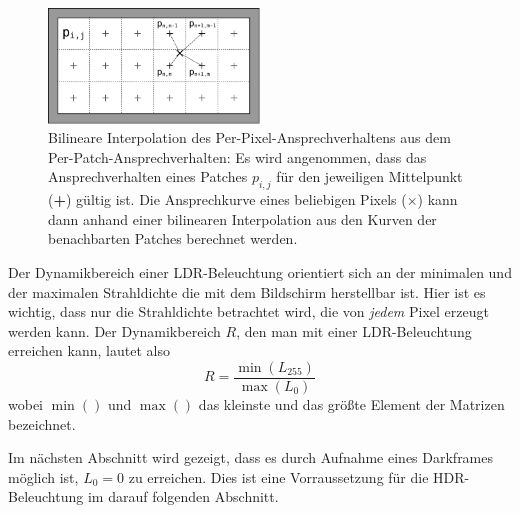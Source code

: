   \begin{figure}[h]
    \centering
    \includegraphics[width=0.5\textwidth]{../graphics/beleuchtung/interpolation.svg}
    \caption[Interpolation des Per-Pixel-Ansprechverhaltens]{ Bilineare Interpolation des Per-Pixel-Ansprechverhaltens aus dem Per-Patch-Ansprechverhalten:
          Es wird angenommen, dass das Ansprechverhalten eines Patches $p_{i,j}$ für den jeweiligen Mittelpunkt (\textbf{+}) gültig ist.
          Die Ansprechkurve eines beliebigen Pixels ($\times$) kann dann anhand einer bilinearen Interpolation aus den Kurven der benachbarten Patches berechnet werden.
          }
    \label{fig:interpolation}
   \end{figure}



%    
 
    Der Dynamikbereich einer LDR-Beleuchtung orientiert sich an der minimalen und der maximalen Strahldichte die mit dem Bildschirm herstellbar ist. 
    Hier ist es wichtig, dass nur die Strahldichte betrachtet wird, die von \emph{jedem} Pixel erzeugt werden kann.
    Der Dynamikbereich $R$, den man mit einer LDR-Beleuchtung erreichen kann, lautet also
     \begin{equation}
       R=\frac{\min{(L_{255})}}{\max{(L_{0})}}
     \end{equation}
    wobei $\min()$ und $\max()$ das kleinste und das größte Element der Matrizen bezeichnet.
    
 
    Im nächsten Abschnitt wird gezeigt, dass es durch Aufnahme eines Darkframes möglich ist, $L_{0} = 0$ zu erreichen.
    Dies ist eine Vorraussetzung für die HDR-Beleuchtung im darauf folgenden Abschnitt.  

